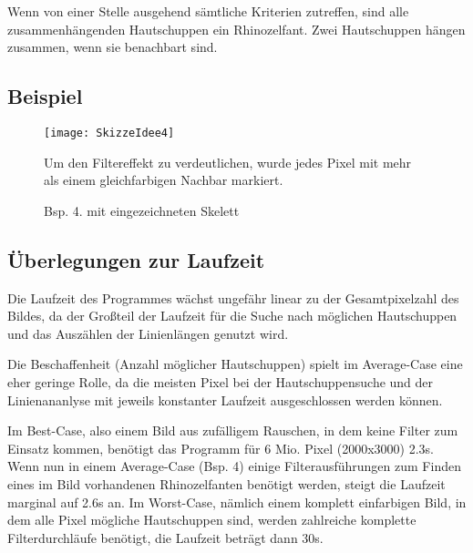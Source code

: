 Wenn von einer Stelle ausgehend sämtliche Kriterien zutreffen, sind alle zusammenhängenden Hautschuppen ein Rhinozelfant. Zwei Hautschuppen hängen zusammen, wenn sie benachbart sind.

\clearpage
\subsection{Beispiel}
\begin{figure}[!ht]
	\centering
	\texttt{[image: SkizzeIdee4]}
	\caption {Bsp. 4. mit eingezeichneten Skelett}
	Um den Filtereffekt zu verdeutlichen, wurde jedes Pixel mit mehr als einem gleichfarbigen Nachbar markiert.
\end{figure}
\clearpage

\subsection {Überlegungen zur Laufzeit}
Die Laufzeit des Programmes wächst ungefähr linear zu der Gesamtpixelzahl des Bildes, da der Großteil der Laufzeit für die Suche nach möglichen Hautschuppen und das Auszählen der Linienlängen genutzt wird.

Die Beschaffenheit (Anzahl möglicher Hautschuppen) spielt im Average-Case eine eher geringe Rolle, da die meisten Pixel bei der Hautschuppensuche und der Linienananlyse mit jeweils konstanter Laufzeit ausgeschlossen werden können.

Im Best-Case, also einem Bild aus zufälligem Rauschen, in dem keine Filter zum Einsatz kommen, benötigt das Programm für 6 Mio. Pixel (2000x3000) 2.3s. 
Wenn nun in einem Average-Case (Bsp. 4) einige Filterausführungen zum Finden eines im Bild vorhandenen Rhinozelfanten benötigt werden, steigt die Laufzeit marginal auf 2.6s an. 
Im Worst-Case, nämlich einem komplett einfarbigen Bild, in dem alle Pixel mögliche Hautschuppen sind, werden zahlreiche komplette Filterdurchläufe benötigt, die Laufzeit beträgt dann 30s.